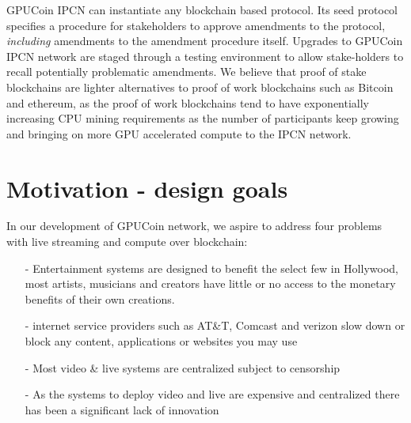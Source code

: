 \documentclass{article}
\begin{document}


GPUCoin IPCN can instantiate any blockchain based protocol. Its seed protocol specifies a procedure for stakeholders to approve amendments to the protocol, \emph{including} amendments to the amendment procedure itself. Upgrades to GPUCoin IPCN network are staged through a testing environment to allow stake-holders to recall potentially problematic amendments. We believe that proof of stake blockchains are lighter alternatives to proof of work blockchains such as Bitcoin and ethereum, as the proof of work blockchains tend to have exponentially increasing CPU mining requirements as the number of participants keep growing and bringing on more GPU accelerated compute to the IPCN network.

\section{Motivation - design goals}
In our development of GPUCoin network, we aspire to address four problems with live streaming and compute over blockchain:
\begin{itemize}
\item[-]Entertainment systems are designed to benefit the select few in Hollywood, most artists, musicians and creators have little or no access to the monetary benefits of their own creations.
\item[-]internet service providers such as AT\&T, Comcast and verizon slow down or block any content, applications or websites you may use
\item[-]Most video \& live systems are centralized subject to censorship

\item[-]As the systems to deploy video and live are expensive and centralized there has been a significant lack of innovation

\end{itemize}
\end{document}
